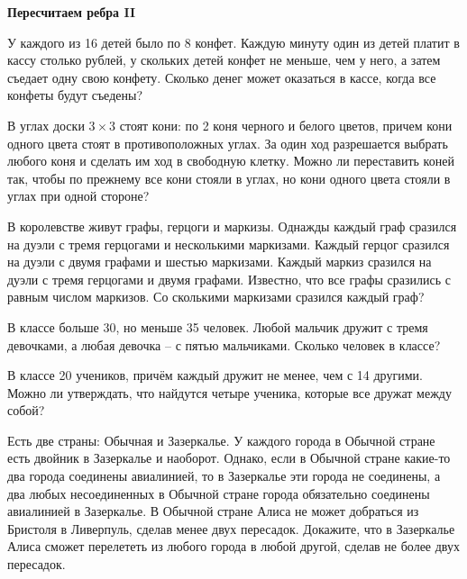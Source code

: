 \centerline{\bf \Huge Пересчитаем ребра II}

\begin{flushright}
        \scriptsize{}
\end{flushright}

У каждого из 16   детей было по 8   конфет. Каждую минуту один из детей платит в кассу столько рублей, у скольких детей конфет не меньше, чем у него, а затем съедает одну свою конфету. Сколько денег может оказаться в кассе, когда все конфеты будут съедены?


В углах доски $3 \times 3$ стоят кони: по 2 коня черного и белого цветов, причем кони одного цвета стоят в противоположных углах. За один ход разрешается выбрать любого коня и сделать им ход в свободную клетку. Можно ли переставить коней так, чтобы по прежнему все кони стояли в углах, но кони одного цвета стояли в углах при одной стороне?

В королевстве живут графы, герцоги и маркизы. Однажды каждый граф сразился на дуэли с тремя герцогами и несколькими маркизами. Каждый герцог сразился на дуэли с двумя графами и шестью маркизами. Каждый маркиз сразился на дуэли с тремя герцогами и двумя графами. Известно, что все графы сразились с равным числом маркизов. Со сколькими маркизами сразился каждый граф?

В классе больше 30, но меньше 35 человек. Любой мальчик дружит с тремя девочками, а любая девочка – с пятью мальчиками. Сколько человек в классе?

В классе 20 учеников, причём каждый дружит не менее, чем с 14 другими.
Можно ли утверждать, что найдутся четыре ученика, которые все дружат между собой?

Есть две страны: Обычная и Зазеркалье. У каждого города в Обычной стране есть двойник в Зазеркалье и наоборот. Однако, если в Обычной стране какие-то два города соединены авиалинией, то в Зазеркалье эти города не соединены, а два любых несоединенных в Обычной стране города обязательно соединены авиалинией в Зазеркалье. В Обычной стране Алиса не может добраться из Бристоля в Ливерпуль, сделав менее двух пересадок. Докажите, что в Зазеркалье Алиса сможет перелететь из любого города в любой другой, сделав не более двух пересадок.
